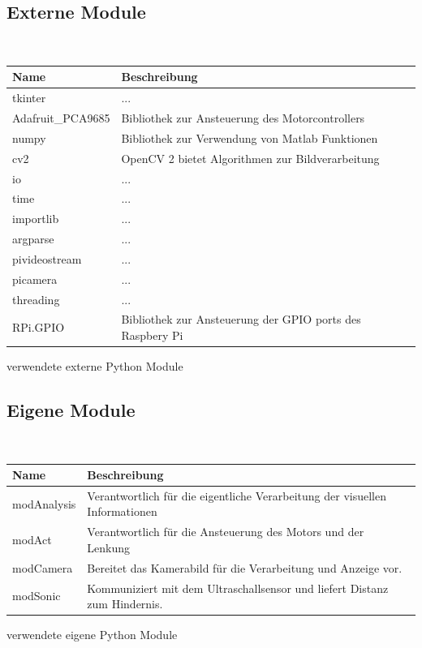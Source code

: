 \documentclass[a4paper,12pt]{article}
\begin{document}
    \subsection{Externe Module}
    \ \\
    \begin{minipage}{\columnwidth}
      \makeatletter
      \def\@captype{table}
      \makeatother
      \centering
      \begin{tabular}{ l | l }
      Name & Beschreibung \\ \hline \hline
      tkinter & ... \\
      Adafruit\_PCA9685 & Bibliothek zur Ansteuerung des Motorcontrollers \\
      numpy & Bibliothek zur Verwendung von Matlab Funktionen \\
      cv2 & OpenCV 2 bietet Algorithmen zur Bildverarbeitung \\
      io & ... \\
      time & ... \\
      importlib & ... \\
      argparse & ... \\
      pivideostream & ... \\
      picamera & ... \\
      threading & ... \\
      RPi.GPIO & Bibliothek zur Ansteuerung der GPIO ports des Raspbery Pi \\
      \end{tabular}
      \caption{verwendete externe Python Module}
      \label{tab:01}
    \end{minipage}
    
    \subsection{Eigene Module}
    \ \\
    \begin{minipage}{\columnwidth}
      \makeatletter
      \def\@captype{table}
      \makeatother
      \centering
      \begin{tabular}{ l | l }
      Name & Beschreibung \\ \hline \hline
      modAnalysis & Verantwortlich für die eigentliche Verarbeitung der visuellen Informationen \\
      modAct & Verantwortlich für die Ansteuerung des Motors und der Lenkung \\
      modCamera & Bereitet das Kamerabild für die Verarbeitung und Anzeige vor. \\
      modSonic & Kommuniziert mit dem Ultraschallsensor und liefert Distanz zum Hindernis.\\
      \end{tabular}
      \caption{verwendete eigene Python Module}
      \label{tab:01}
    \end{minipage}


      


      \newpage
      
\end{document}
